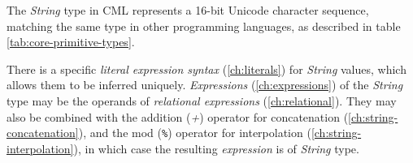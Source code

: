 The \emph{String} type in CML represents a 16-bit Unicode character sequence,
matching the same type in other programming languages,
as described in table \ref{tab:core-primitive-types}.

There is a specific \emph{literal expression syntax} (\ref{ch:literals})
for \emph{String} values,
which allows them to be inferred uniquely.
\emph{Expressions} (\ref{ch:expressions}) of the \emph{String} type
may be the operands of \emph{relational expressions} (\ref{ch:relational}).
They may also be combined with the addition (\emph{+}) operator
for concatenation (\ref{ch:string-concatenation}),
and the mod (\verb|%|) operator
for interpolation (\ref{ch:string-interpolation}),
in which case the resulting \emph{expression} is of \emph{String} type.
